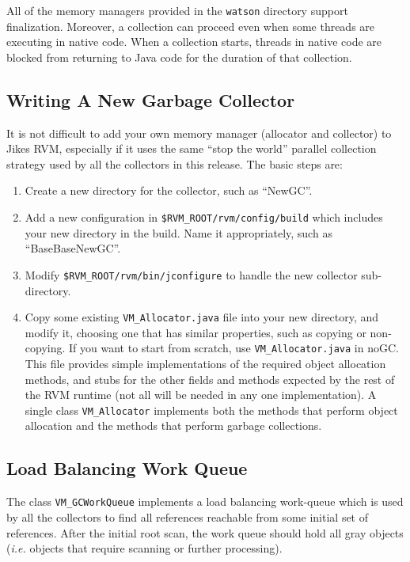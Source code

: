 All of the memory managers provided in the {\tt watson} directory
support finalization.  Moreover, a collection can proceed even 
when some threads are executing in native code. When a collection 
starts, threads in native code are blocked from returning to Java code
for the duration of that collection.

\subsection{Writing A New Garbage Collector} \label{sssec:newalloc}
It is not difficult to add your own memory manager (allocator and collector) to Jikes RVM,
especially if it uses the same ``stop the world'' parallel collection
strategy used by all the collectors in this release.  The basic steps
are:
\begin{enumerate}
\item Create a new directory for the collector, such as ``NewGC''.
\item Add a new configuration in {\tt \$RVM\_ROOT/rvm/config/build}
which includes your new directory in the build.  Name it appropriately, such as
``BaseBaseNewGC''.
\item Modify {\tt \$RVM\_ROOT/rvm/bin/jconfigure} to handle the new collector sub-directory.
\item Copy some existing {\tt VM\_Allocator.java} file into your new directory,
and modify it, choosing one that has similar properties, such as copying or
non-copying.  If you want to start from scratch, use {\tt VM\_Allocator.java} in noGC.
This file provides simple implementations of the required object allocation
methods, and stubs for the other fields and methods expected by the rest
of the RVM runtime (not all will be needed in any one implementation).
A single class {\tt VM\_Allocator} implements both
the methods that perform object allocation and the methods that perform
garbage collections.
\end{enumerate}

\subsection{Load Balancing Work Queue} \label{sssec:workqueue}
The class {\tt VM\_GCWorkQueue} implements a load balancing work-queue
which is used by all the collectors to find all references reachable from
some initial set of references.  After the initial root scan, the work queue
should hold all gray objects ({\it i.e.} objects that require scanning or further
processing).

